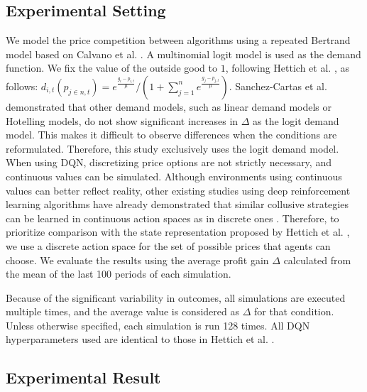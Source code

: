 \documentclass[runningheads]{llncs}
\begin{document}
\subsection{Experimental Setting}
    We model the price competition between algorithms using a repeated Bertrand model based on Calvano et al. \cite{calvano2020a}.
    A multinomial logit model is used as the demand function.
    We fix the value of the outside good to $1$, following Hettich et al. \cite{hettich2021}, as follows:
    $d_{i,t} \left( p_{j \in n,t} \right) = e^{\frac{g_i - p_{i,t}}{\mu}}/(1 + \sum_{j=1}^{n} e^{\frac{g_j - p_{j,t}}{\mu}})$. 
    Sanchez-Cartas et al. \cite{Sanchez-Cartas2022} demonstrated that other demand models, such as linear demand models or Hotelling models, do not show significant increases in $\Delta$ as the logit demand model.
    This makes it difficult to observe differences when the conditions are reformulated.
    Therefore, this study exclusively uses the logit demand model.
    When using DQN, discretizing price options are not strictly necessary, and continuous values can be simulated.
    Although environments using continuous values can better reflect reality, other existing studies using deep reinforcement learning algorithms have already demonstrated that similar collusive strategies can be learned in continuous action spaces as in discrete ones \cite{deng2024algorithmic,martello2022autonomous}.
    Therefore, to prioritize comparison with the state representation proposed by Hettich et al. \cite{hettich2021}, we use a discrete action space for the set of possible prices that agents can choose.
    We evaluate the results using the average profit gain $\Delta$ calculated from the mean of the last 100 periods of each simulation.

    Because of the significant variability in outcomes, all simulations are executed multiple times, and the average value is considered as $\Delta$ for that condition.
    Unless otherwise specified, each simulation is run 128 times.
    All DQN hyperparameters used are identical to those in Hettich et al. \cite{hettich2021}.


\subsection{Experimental Result}
\end{document}
